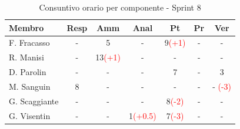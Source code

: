 \documentclass[a4paper,12pt]{article}
\begin{document}
\begin{table}[H]
    \centering
    \renewcommand{\arraystretch}{1.4}
    \footnotesize
    \begin{tabularx}{\textwidth}{|l|C|C|C|C|C|C|}
        \hline
        \textbf{Membro} & \textbf{Resp} & \textbf{Amm} & \textbf{Anal} & \textbf{Pt} & \textbf{Pr} & \textbf{Ver} \\
        \hline
        F. Fracasso & - & 5 & - & 9\textcolor{red}{(+1)} & - & - \\
        \hline
        R. Manisi & - & 13\textcolor{red}{(+1)} & - & - & - & - \\
        \hline
        D. Parolin & - & - & - & 7 & - & 3 \\
        \hline
        M. Sanguin & 8 & - & - & - & - & - \textcolor{red}{(-3)} \\
        \hline
        G. Scaggiante & - & - & - & 8\textcolor{red}{(-2)} & - & - \\
        \hline
        G. Visentin & - & - & 1\textcolor{red}{(+0.5)} & 7\textcolor{red}{(-3)} & - & - \\
        \hline
    \end{tabularx}
    \caption{Consuntivo orario per componente - Sprint 8}
    \label{tab:consuntivo_sprint8}
\end{table}
\end{document}
